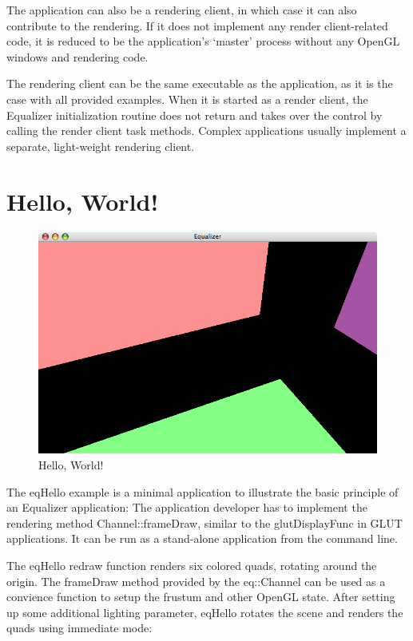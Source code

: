 \documentclass[10pt,a4]{scrartcl}
\begin{document}
The application can also be a rendering client, in which case it can
also contribute to the rendering. If it does not implement any render
client-related code, it is reduced to be the application's `master'
process without any OpenGL windows and rendering code.

The rendering client can be the same executable as the application, as
it is the case with all provided examples. When it is started as a
render client, the Equalizer initialization routine does not return and
takes over the control by calling the render client task
methods. Complex applications usually implement a separate, light-weight
rendering client.


\section{Hello, World!}

\begin{figure}
  \includegraphics[width=.618\textwidth]{images/eqHello.png}
  {\caption{\small\label{fHello}Hello, World!}}
\end{figure}

The \textsf{eqHello} example is a minimal application to illustrate the
basic principle of an Equalizer application: The application developer
has to implement the rendering method \textsf{Channel::frameDraw},
similar to the \textsf{glutDisplayFunc} in GLUT applications. It can be
run as a stand-alone application from the command line.

The \textsf{eqHello} redraw function renders six colored quads, rotating
around the origin. The \textsf{frameDraw} meth\-od provided by the
\textsf{eq::Channel} can be used as a convience function to setup the
frustum and other OpenGL state. After setting up some additional
lighting parameter, \textsf{eqHello} rotates the scene and renders the
quads using immediate mode:
\end{document}
